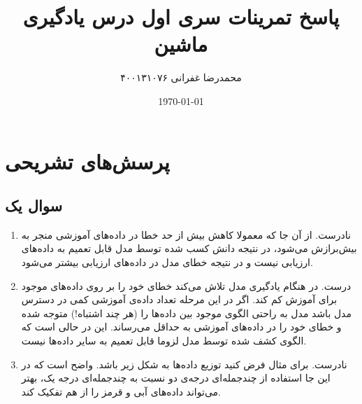 \documentclass[14pt,a4]{article}
\title{\vspace{-4cm} \textbf{پاسخ تمرینات سری اول درس یادگیری ماشین}}
\author{محمدرضا غفرانی  ۴۰۰۱۳۱۰۷۶}
\date{\today}
\begin{document}
\maketitle

\section*{پرسش‌های تشریحی}

\subsection*{سوال یک}

\begin{enumerate}[label=\alph* )]
    \item نادرست. از آن جا که معمولا کاهش بیش از حد خطا در داده‌های آموزشی منجر به بیش‌برازش می‌شود، در نتیجه
    دانش کسب شده توسط مدل قابل تعمیم به داده‌های ارزیابی نیست و در نتیجه خطای مدل در داده‌های ارزیابی بیشتر می‌شود.
    \item درست. در هنگام یادگیری مدل تلاش می‌کند خطای خود را بر روی داده‌های موجود برای آموزش کم کند. اگر در این
    مرحله تعداد داده‌ی آموزشی کمی در دسترس مدل  باشد مدل به راحتی الگوی موجود بین داده‌ها را (هر چند اشتباه!)
    متوجه شده و خطای خود را در داده‌های آموزشی به حداقل می‌رساند. این در حالی است که الگوی کشف شده توسط مدل
    لزوما قابل تعمیم به سایر داده‌ها نیست.
    \item نادرست. برای مثال فرض کنید توزیع داده‌ها به شکل زیر باشد. واضح است که در این جا استفاده از چندجمله‌ای درجه‌ی
    دو نسبت به چندجمله‌ای درجه یک، بهتر می‌تواند داده‌های آبی و قرمز را از هم تفکیک کند.


\end{enumerate}
\end{document}
